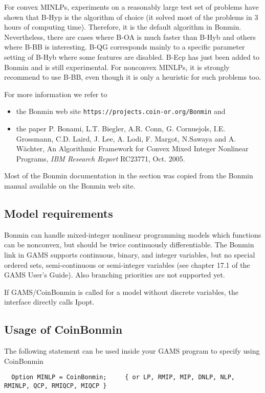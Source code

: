 For convex MINLPs, experiments on a reasonably large test set of problems have shown that B-Hyp is the algorithm of choice (it solved most of the problems in 3 hours of computing time).
Therefore, it is the default algorithm in Bonmin.
Nevertheless, there are cases where B-OA is much faster than B-Hyb and others where B-BB is interesting.
B-QG corresponds mainly to a specific parameter setting of B-Hyb where some features are disabled.
B-Ecp has just been added to Bonmin and is still experimental.
For nonconvex MINLPs, it is strongly recommend to use B-BB, even though it is only a heuristic for such problems too.

For more information we refer to
\begin{itemize}
\item the Bonmin web site \texttt{https://projects.coin-or.org/Bonmin} and
\item the paper P. Bonami, L.T. Biegler, A.R. Conn, G. Cornuejols, I.E. Grossmann, C.D. Laird, J. Lee, A. Lodi, F. Margot, N.Sawaya and A. W\"achter, An Algorithmic Framework for Convex Mixed Integer Nonlinear Programs, \emph{IBM Research Report} RC23771, Oct. 2005.
\end{itemize}
Most of the Bonmin documentation in the section was copied from the Bonmin manual available on the Bonmin web site.

\subsection{Model requirements}

Bonmin can handle mixed-integer nonlinear programming models which functions can be nonconvex, but should be twice continuously differentiable.
The Bonmin link in GAMS supports continuous, binary, and integer variables, but no special ordered sets, semi-continuous or semi-integer variables (see chapter 17.1 of the GAMS User's Guide).
Also branching priorities are not supported yet.

If GAMS/CoinBonmin is called for a model without discrete variables, the interface directly calls Ipopt.

\subsection{Usage of CoinBonmin}

The following statement can be used inside your GAMS program to specify using CoinBonmin
\begin{verbatim}
  Option MINLP = CoinBonmin;     { or LP, RMIP, MIP, DNLP, NLP, RMINLP, QCP, RMIQCP, MIQCP }
\end{verbatim}


